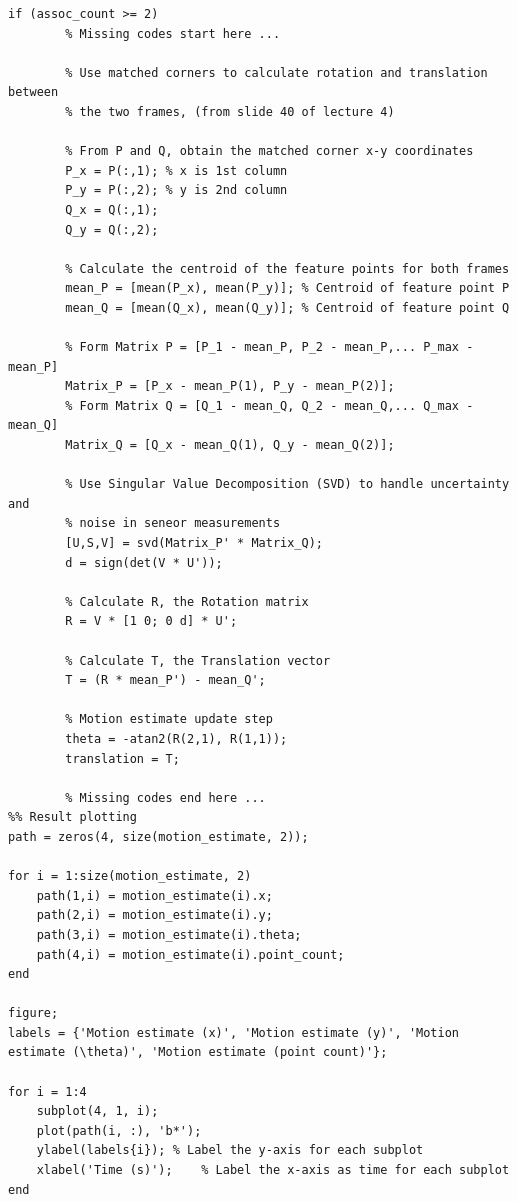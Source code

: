 \begin{lstlisting}
if (assoc_count >= 2)
        % Missing codes start here ...
        
   		% Use matched corners to calculate rotation and translation between
   		% the two frames, (from slide 40 of lecture 4)
        
        % From P and Q, obtain the matched corner x-y coordinates
        P_x = P(:,1); % x is 1st column
        P_y = P(:,2); % y is 2nd column
        Q_x = Q(:,1);
        Q_y = Q(:,2);

        % Calculate the centroid of the feature points for both frames
        mean_P = [mean(P_x), mean(P_y)]; % Centroid of feature point P
        mean_Q = [mean(Q_x), mean(Q_y)]; % Centroid of feature point Q

        % Form Matrix P = [P_1 - mean_P, P_2 - mean_P,... P_max - mean_P]
        Matrix_P = [P_x - mean_P(1), P_y - mean_P(2)];
        % Form Matrix Q = [Q_1 - mean_Q, Q_2 - mean_Q,... Q_max - mean_Q]
        Matrix_Q = [Q_x - mean_Q(1), Q_y - mean_Q(2)];

        % Use Singular Value Decomposition (SVD) to handle uncertainty and
        % noise in seneor measurements
        [U,S,V] = svd(Matrix_P' * Matrix_Q);
        d = sign(det(V * U'));

        % Calculate R, the Rotation matrix
        R = V * [1 0; 0 d] * U';

        % Calculate T, the Translation vector
        T = (R * mean_P') - mean_Q';

        % Motion estimate update step
        theta = -atan2(R(2,1), R(1,1));
        translation = T;

        % Missing codes end here ...
%% Result plotting
path = zeros(4, size(motion_estimate, 2));

for i = 1:size(motion_estimate, 2)
    path(1,i) = motion_estimate(i).x;
    path(2,i) = motion_estimate(i).y;
    path(3,i) = motion_estimate(i).theta;
    path(4,i) = motion_estimate(i).point_count;
end

figure;
labels = {'Motion estimate (x)', 'Motion estimate (y)', 'Motion estimate (\theta)', 'Motion estimate (point count)'};

for i = 1:4
    subplot(4, 1, i);
    plot(path(i, :), 'b*'); 
    ylabel(labels{i}); % Label the y-axis for each subplot
    xlabel('Time (s)');    % Label the x-axis as time for each subplot
end
\end{lstlisting}
